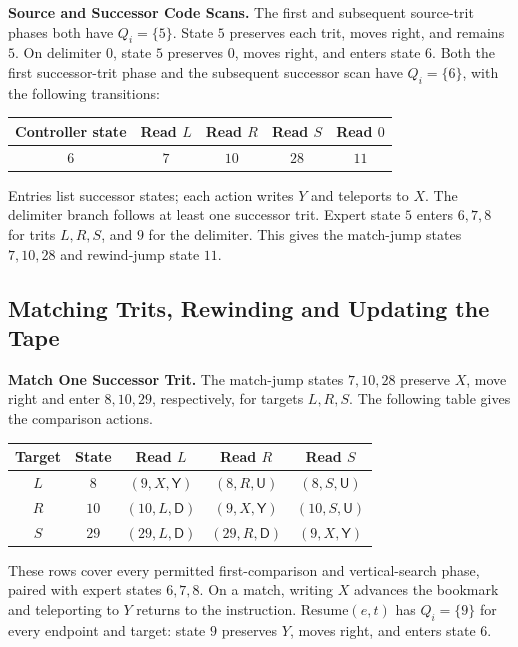 \documentclass[11pt,a4paper]{article}
\newcommand{\triple}[3]{(#1,#2,\mathsf{#3})}
\begin{document}
\textbf{Source and Successor Code Scans.}
The first and subsequent source-trit phases both have $Q_i=\{5\}$.
State $5$ preserves each trit, moves right, and remains $5$.
On delimiter $0$, state $5$ preserves $0$, moves right, and enters state $6$.
Both the first successor-trit phase and the subsequent successor scan
have $Q_i=\{6\}$, with the following transitions:
\begin{center}
\small\renewcommand{\arraystretch}{1.3}
\begin{tabular}{c cccc}
\toprule\rowcolor{Pale}Controller state & Read $L$ & Read $R$ & Read $S$ & Read $0$\\\midrule
$6$ & $7$ & $10$ & $28$ & $11$\\
\bottomrule
\end{tabular}
\end{center}
Entries list successor states; each action writes $Y$ and teleports to $X$.
The delimiter branch follows at least one successor trit.
Expert state $5$ enters $6,7,8$ for trits $L,R,S$, and $9$ for the delimiter.
This gives the match-jump states $7,10,28$ and rewind-jump state $11$.

\newpage
\subsection{Matching Trits, Rewinding and Updating the Tape}\label{sec:part5}
\textbf{Match One Successor Trit.}
The match-jump states $7,10,28$ preserve $X$, move right and enter $8,10,29$,
respectively, for targets $L,R,S$. The following table gives the comparison actions.

\begin{center}
\small\renewcommand{\arraystretch}{1.35}
\begin{tabular}{c c ccc}
\toprule\rowcolor{Pale}Target & State & Read $L$ & Read $R$ & Read $S$\\\midrule
$L$ & $8$ & $\triple{9}{X}{Y}$ & $\triple{8}{R}{U}$ & $\triple{8}{S}{U}$\\
$R$ & $10$ & $\triple{10}{L}{D}$ & $\triple{9}{X}{Y}$ & $\triple{10}{S}{U}$\\
$S$ & $29$ & $\triple{29}{L}{D}$ & $\triple{29}{R}{D}$ & $\triple{9}{X}{Y}$\\
\bottomrule
\end{tabular}
\end{center}
These rows cover every permitted first-comparison and vertical-search
phase, paired with expert states $6,7,8$.
On a match, writing $X$ advances the bookmark and teleporting to $Y$
returns to the instruction. Resume$(e,t)$ has $Q_i=\{9\}$ for every endpoint
and target: state $9$ preserves $Y$, moves right, and enters state $6$.
\end{document}

